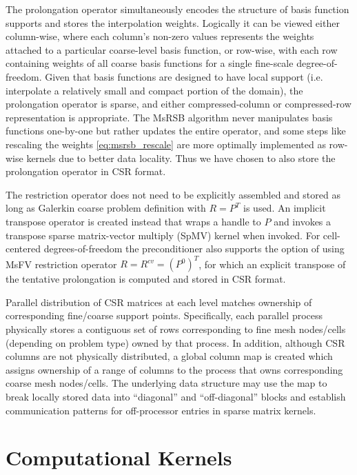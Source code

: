 The prolongation operator simultaneously encodes the structure of basis function supports and stores the interpolation weights.   Logically it can be viewed either column-wise, where each column's non-zero values represents the weights attached to a particular coarse-level basis function, or row-wise, with each row containing weights of all coarse basis functions for a single fine-scale degree-of-freedom.   Given that basis functions are designed to have local support (i.e. interpolate a relatively small and compact portion of the domain), the prolongation operator is sparse, and either compressed-column or compressed-row representation is appropriate.   The MsRSB algorithm never manipulates basis functions one-by-one but rather updates the entire operator, and some steps like rescaling the weights \cref{eq:msrsb_rescale} are more optimally implemented as row-wise kernels due to better data locality.   Thus we have chosen to also store the prolongation operator in CSR format.

The restriction operator does not need to be explicitly assembled and stored as long as Galerkin coarse problem definition with $R = P^T$ is used.   An implicit transpose operator is created instead that wraps a handle to $P$ and invokes a transpose sparse matrix-vector multiply (SpMV) kernel when invoked.   For cell-centered degrees-of-freedom the preconditioner also supports the option of using MsFV restriction operator $R = R^{cv} = (P^0)^T$, for which an explicit transpose of the tentative prolongation is computed and stored in CSR format.

Parallel distribution of CSR matrices at each level matches ownership of corresponding fine/coarse support points.   Specifically, each parallel process physically stores a contiguous set of rows corresponding to fine mesh nodes/cells (depending on problem type) owned by that process.   In addition, although CSR columns are not physically distributed, a global column map is created which assigns ownership of a range of columns to the process that owns corresponding coarse mesh nodes/cells.   The underlying data structure may use the map to break locally stored data into ``diagonal'' and ``off-diagonal'' blocks and establish communication patterns for off-processor entries in sparse matrix kernels.

\section{Computational Kernels}
\label{sec:par_kernels}


